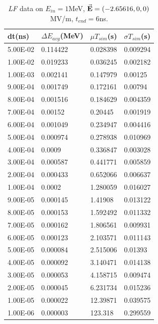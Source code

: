 \documentclass[a4paper,oneside,12pt]{report}
\numberwithin{equation}{chapter}
\begin{document}
\begin{table}[H]
    \centering
    \caption{\textit{LF} data on $E_{in}=1$MeV, $\vec{\textbf{E}}=(-2.65616, 0, 0)$ MV/m, $t_{end}=6$ns.}
    \vspace{10pt}
    \begin{tabular}{|l|l|l|l|}
    \hline
    dt(ns)       & $\Delta E_{avg}$(MeV) & $\mu T_{sim}$(s)    & $\sigma T_{sim}$(s) \\\hline
    5.00E-02 & 0.114422     & 0.028398 & 0.009294 \\\hline
    1.00E-02 & 0.019233     & 0.036245 & 0.002182 \\\hline
    1.00E-03 & 0.002141     & 0.147979 & 0.00125  \\\hline
    9.00E-04 & 0.001749     & 0.172161 & 0.00794  \\\hline
    8.00E-04 & 0.001516     & 0.184629 & 0.004359 \\\hline
    7.00E-04 & 0.00152      & 0.20445  & 0.001919 \\\hline
    6.00E-04 & 0.001049     & 0.234947 & 0.004416 \\\hline
    5.00E-04 & 0.000974     & 0.278938 & 0.010969 \\\hline
    4.00E-04 & 0.0009       & 0.336847 & 0.003028 \\\hline
    3.00E-04 & 0.000587     & 0.441771 & 0.005859 \\\hline
    2.00E-04 & 0.000433     & 0.652066 & 0.006637 \\\hline
    1.00E-04 & 0.0002       & 1.280059 & 0.016027 \\\hline
    9.00E-05 & 0.000145     & 1.41908  & 0.013122 \\\hline
    8.00E-05 & 0.000153     & 1.592492 & 0.011332 \\\hline
    7.00E-05 & 0.000162     & 1.806561 & 0.009931 \\\hline
    6.00E-05 & 0.000123     & 2.103571 & 0.011143 \\\hline
    5.00E-05 & 0.000084     & 2.515006 & 0.01393  \\\hline
    4.00E-05 & 0.000092     & 3.140471 & 0.014138 \\\hline
    3.00E-05 & 0.000053     & 4.158715 & 0.009474 \\\hline
    2.00E-05 & 0.000045     & 6.231734 & 0.015236 \\\hline
    1.00E-05 & 0.000022     & 12.39871 & 0.039575 \\\hline
    1.00E-06 & 0.000003     & 123.318  & 0.299559 \\\hline
    \end{tabular}
    \label{tab:lf_statE_table}
\end{table}
\end{document}
